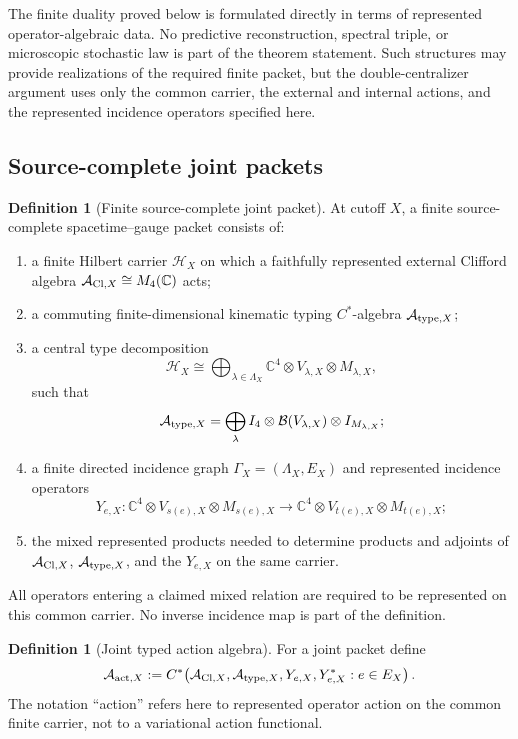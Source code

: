 \documentclass[11pt]{article}
\numberwithin{equation}{section}
\theoremstyle{definition}
\newtheorem{definition}[theorem]{Definition}
\theoremstyle{remark}
\newcommand{\C}{\mathbb C}
\newcommand{\A}{\mathcal A}
\newcommand{\Hh}{\mathcal H}
\begin{document}
The finite duality proved below is formulated directly in terms of represented
operator-algebraic data.  No predictive reconstruction, spectral triple, or
microscopic stochastic law is part of the theorem statement.  Such structures
may provide realizations of the required finite packet, but the
double-centralizer argument uses only the common carrier, the external and
internal actions, and the represented incidence operators specified here.

\subsection{Source-complete joint packets}

\begin{definition}[Finite source-complete joint packet]
\label{def:joint-packet}
At cutoff $X$, a finite source-complete spacetime--gauge packet consists of:
\begin{enumerate}[label=\textup{(J\arabic*)},leftmargin=3em]
\item a finite Hilbert carrier $\Hh_X$ on which a faithfully represented
      external Clifford algebra
      $\A_{{\rm Cl},X}\cong M_4(\C)$ acts;
\item a commuting finite-dimensional kinematic typing $C^*$-algebra
      $\A_{{\rm type},X}$;
\item a central type decomposition
      \[
      \Hh_X
      \cong
      \bigoplus_{\lambda\in\Lambda_X}
      \C^4\otimes V_{\lambda,X}\otimes M_{\lambda,X},
      \]
      such that
      \[
      \A_{{\rm type},X}
      =
      \bigoplus_{\lambda}
      I_4\otimes\mathcal B(V_{\lambda,X})\otimes I_{M_{\lambda,X}};
      \]
\item a finite directed incidence graph
      $\Gamma_X=(\Lambda_X,E_X)$ and represented incidence operators
      \[
      Y_{e,X}:
      \C^4\otimes V_{s(e),X}\otimes M_{s(e),X}
      \longrightarrow
      \C^4\otimes V_{t(e),X}\otimes M_{t(e),X};
      \]
\item the mixed represented products needed to determine products and adjoints
      of $\A_{{\rm Cl},X}$, $\A_{{\rm type},X}$, and the $Y_{e,X}$ on the same
      carrier.
\end{enumerate}
All operators entering a claimed mixed relation are required to be represented
on this common carrier.  No inverse incidence map is part of the definition.
\end{definition}

\begin{definition}[Joint typed action algebra]
\label{def:action-algebra}
For a joint packet define
\begin{equation}
\A_{{\rm act},X}
:=
C^*\!\left(
\A_{{\rm Cl},X},
\A_{{\rm type},X},
Y_{e,X},Y_{e,X}^*:e\in E_X
\right).
\label{eq:joint-action-algebra}
\end{equation}
The notation ``action'' refers here to represented operator action on the
common finite carrier, not to a variational action functional.
\end{definition}
\end{document}
